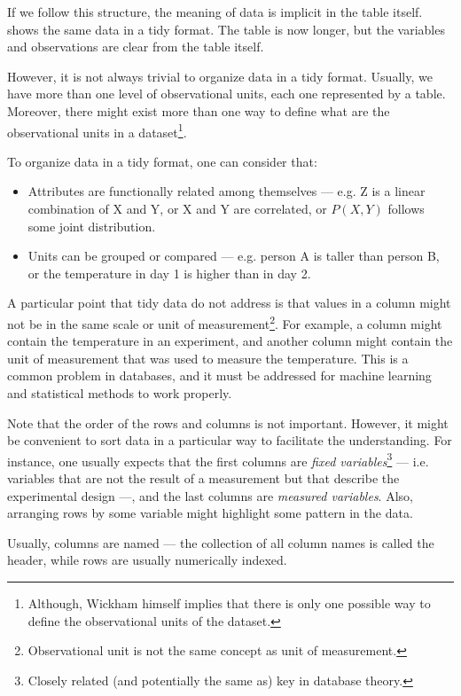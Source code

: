 If we follow this structure, the meaning of data is implicit in the table itself.
 shows the same data in a tidy format.  The table is now longer, but
the variables and observations are clear from the table itself.

However, it is not always trivial to organize data in a tidy format.  Usually, we have
more than one level of observational units, each one represented by a table.  Moreover,
there might exist more than one way to define what are the observational units in a
dataset\footnote{Although, Wickham himself implies that there is only one possible way to
define the observational units of the dataset.}.

To organize data in a tidy format, one can consider that:
\begin{itemize}
  \itemsep0em
  \item Attributes are functionally related among themselves --- e.g. Z is a linear
    combination of X and Y, or X and Y are correlated, or $P(X, Y)$ follows some joint distribution.
  \item Units can be grouped or compared --- e.g. person A is taller than person B, or
    the temperature in day 1 is higher than in day 2.
\end{itemize}

A particular point that tidy data do not address is that values in a column might not be
in the same scale or unit of measurement\footnote{Observational unit is not the same
concept as unit of measurement.}.  For example, a column might contain the
temperature in an experiment, and another column might contain the unit of measurement
that was used to measure the temperature.  This is a common problem in databases, and it
must be addressed for machine learning and statistical methods to work properly.

Note that the order of the rows and columns is not important.  However, it might be
convenient to sort data in a particular way to facilitate the understanding.  For
instance, one usually expects that the first columns are \emph{fixed
variables}\footnote{Closely related (and potentially the same as) key in database
theory.} --- i.e. variables that are not the result of a measurement but that describe the
experimental design ---, and the last columns
are \emph{measured variables}.  Also, arranging rows by some variable might highlight some
pattern in the data.

Usually, columns are named --- the collection of all column names is called the
header, while rows are usually numerically indexed.


